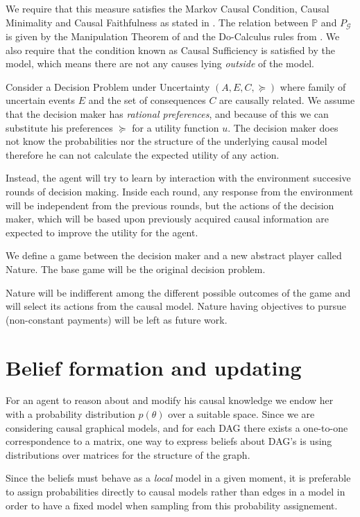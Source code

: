 \documentclass{article}
\begin{document}
We require that this measure satisfies the Markov Causal Condition, Causal Minimality and Causal Faithfulness as stated in \cite{spirtes2000causation}. The relation between $\mathbb{P}$ and $P_{\mathcal{G}}$ is given by the Manipulation Theorem of \cite{spirtes2000causation} and the Do-Calculus rules from \cite{pearl2009causality}. We also require that the condition known as Causal Sufficiency is satisfied by the model, which means there are not any causes lying \textit{outside} of the model. 

Consider a Decision Problem under Uncertainty $(A,E,C,\succeq)$ where family of uncertain events $E$ and the set of consequences $C$ are causally related. We assume that the decision maker has \textit{rational preferences}, and because of this we can substitute his preferences $\succeq$ for a utility function $u$. The decision maker does not know the probabilities nor the structure of the underlying causal model therefore he can not calculate the expected utility of any action. 

Instead, the agent will try to learn by interaction with the environment succesive rounds of decision making. Inside each round, any response from the environment will be independent from the previous rounds, but the actions of the decision maker, which will be based upon previously acquired causal information are expected to improve the utility for the agent.

We define a game between the decision maker and a new abstract player called Nature. The base game will be the original decision problem.

Nature will be indifferent among the different possible outcomes of the game and will select its actions from the causal model. Nature having objectives to pursue (non-constant payments) will be left as future work.

\section{Belief formation and updating}
For an agent to reason about and modify his causal knowledge we endow her with a probability distribution $p(\theta)$ over a suitable space. Since we are considering causal graphical models, and for each DAG there exists a one-to-one correspondence to a matrix, one way to express beliefs about DAG's is using distributions over matrices for the structure of the graph.

Since the beliefs must behave as a \textit{local} model in a given moment, it is preferable to assign probabilities directly to causal models rather than edges in a model in order to have a fixed model when sampling from this probability assignement.
\end{document}

